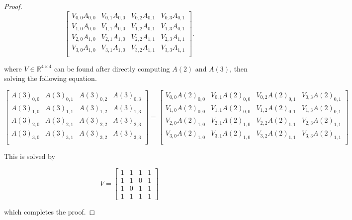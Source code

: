 \documentclass[12pt]{article}
\theoremstyle{plain}
\theoremstyle{definition}
\theoremstyle{remark}
\theoremstyle{definition}
\begin{document}
\begin{proof}
\begin{equation}\label{eqn: coefficient matrix prod}
    \begin{bmatrix}
        V_{0,0}A_{0,0} & V_{0,1}A_{0,0} & V_{0,2}A_{0,1} & V_{0,3}A_{0,1} \\
        V_{1,0}A_{0,0} & V_{1,1}A_{0,0} & V_{1,2}A_{0,1} & V_{1,3}A_{0,1} \\
        V_{2,0}A_{1,0} & V_{2,1}A_{1,0} & V_{2,2}A_{1,1} & V_{2,3}A_{1,1} \\
        V_{3,0}A_{1,0} & V_{3,1}A_{1,0} & V_{3,2}A_{1,1} & V_{3,3}A_{1,1} \\
    \end{bmatrix}.
\end{equation}


where $V \in \mathbb{R}^{4 \times 4}$ can be found after directly computing $A(2)$ and $A(3)$, then solving the following equation.

$$
\begin{bmatrix}
    A(3)_{0,0} & A(3)_{0,1} & A(3)_{0,2} & A(3)_{0,3} \\
    A(3)_{1,0} & A(3)_{1,1} & A(3)_{1,2} & A(3)_{1,3} \\
    A(3)_{2,0} & A(3)_{2,1} & A(3)_{2,2} & A(3)_{2,3} \\
    A(3)_{3,0} & A(3)_{3,1} & A(3)_{3,2} & A(3)_{3,3} \\
\end{bmatrix} = 
\begin{bmatrix}
    V_{0,0}A(2)_{0,0} & V_{0,1}A(2)_{0,0} & V_{0,2}A(2)_{0,1} & V_{0,3}A(2)_{0,1} \\
    V_{1,0}A(2)_{0,0} & V_{1,1}A(2)_{0,0} & V_{1,2}A(2)_{0,1} & V_{1,3}A(2)_{0,1} \\
    V_{2,0}A(2)_{1,0} & V_{2,1}A(2)_{1,0} & V_{2,2}A(2)_{1,1} & V_{2,3}A(2)_{1,1} \\
    V_{3,0}A(2)_{1,0} & V_{3,1}A(2)_{1,0} & V_{3,2}A(2)_{1,1} & V_{3,3}A(2)_{1,1} \\
\end{bmatrix}
$$

This is solved by

$$V = 
\begin{bmatrix} 
    1 & 1 & 1 & 1 \\ 
    1 & 1 & 0 & 1 \\ 
    1 & 0 & 1 & 1 \\ 
    1 & 1 & 1 & 1 
\end{bmatrix}
$$


which completes the proof.

\end{proof}
\end{document}

